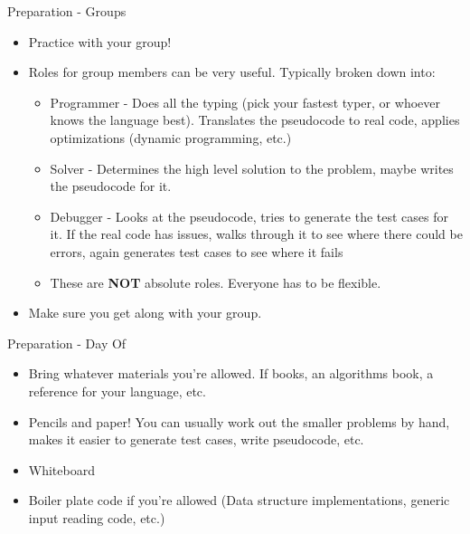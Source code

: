 \documentclass{beamer}
\begin{document}
\begin{frame}{Preparation - Groups}
  \begin{centering}
    \begin{itemize}
      \item Practice with your group!
      \item Roles for group members can be very useful. Typically broken down into:
      \begin{itemize}
        \item Programmer - Does all the typing (pick your fastest typer, or whoever knows the language best). Translates the pseudocode to real code, applies optimizations (dynamic programming, etc.)
        \item Solver - Determines the high level solution to the problem, maybe writes the pseudocode for it.
        \item Debugger - Looks at the pseudocode, tries to generate the test cases for it. If the real code has issues, walks through it to see where there could be errors, again generates test cases to see where it fails
          \item These are \textbf{NOT} absolute roles. Everyone has to be flexible.
      \end{itemize}
      \pause
      \item Make sure you get along with your group.
    \end{itemize}
  \end{centering}
\end{frame}

\begin{frame}{Preparation - Day Of}
  \begin{centering}
    \begin{itemize}
      \item Bring whatever materials you're allowed. If books, an algorithms book, a reference for your language, etc.
      \item Pencils and paper! You can usually work out the smaller problems by hand, makes it easier to generate test cases, write pseudocode, etc.
      \item Whiteboard
      \item Boiler plate code if you're allowed (Data structure implementations, generic input reading code, etc.)
    \end{itemize}
  \end{centering}
\end{frame}
\end{document}
